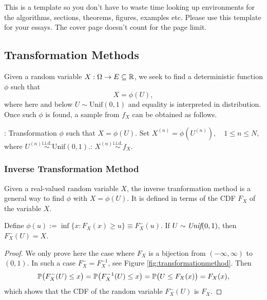 \section{\Large{}}

\red This is a template so you don't have to waste time looking up environments for the algorithms, sections, theorems, figures, examples etc.  Please use this template for your essays. The cover page doesn't count for the page limit. \nc

\subsection{Transformation Methods}\label{ssec:transformation}
Given a random variable $X: \Omega \rightarrow E \subseteq \mathbb{R}$, we seek to find a deterministic function $\phi$ such that
$$X=\phi(U),$$
where here and below $U\sim \text{Unif}(0,1)$ and equality is interpreted in distribution. Once such $\phi$ is found, a sample from $f_X$ can be obtained as follows.


\FloatBarrier
\begin{algorithm}
\caption{General transformation method}
\begin{algorithmic}[1]
: Transformation $\phi$ such that $X = \phi(U).$
\STATE Set $X^{(n)}=\phi(U^{(n)}),\quad 1\leq n\leq N,$ \quad 
where $U^{(n)}\stackrel{\text{i.i.d.}}{\sim} \text{Unif}(0,1)$.: $X^{(n)}\stackrel{\text{i.i.d.}}{\sim}f_X.$
\end{algorithmic}
\end{algorithm}

 


\subsubsection{Inverse Transformation Method}\label{sssec:inversetransformation}
Given a real-valued random variable $X$, the inverse tranformation method is a general way to find $\phi$ with $X = \phi(U).$ It is defined in terms of the CDF $F_X$ of the variable $X.$

\begin{theorem}\label{thm:inversetransf}
Define $\phi (u):= \inf\{x:F_X(x)\geq u\}\equiv F_X^-(u)$. If $U\sim \emph{Unif}(0,1)$, then $F_X^-(U)=X.$
\end{theorem}
\begin{proof}
We only prove here the case where $F_X$ is a bijection from $(-\infty,\infty)$ to $(0,1).$ In such a case $F_X^-=F_X^{-1}$, see Figure \ref{fig:transformationmethod}.
Then
$$\operatorname{\mathbb{P}} \bigl(F_X^-(U)\leq x\bigr)=\operatorname{\mathbb{P}} \bigl(F_X^{-1}(U)\leq x\bigr)=\operatorname{\mathbb{P}}\bigl(U\leq F_X(x)\bigr)=F_X(x),$$
which shows that the CDF of the random variable $F_X^-(U)$ is $F_X$.
\end{proof}


